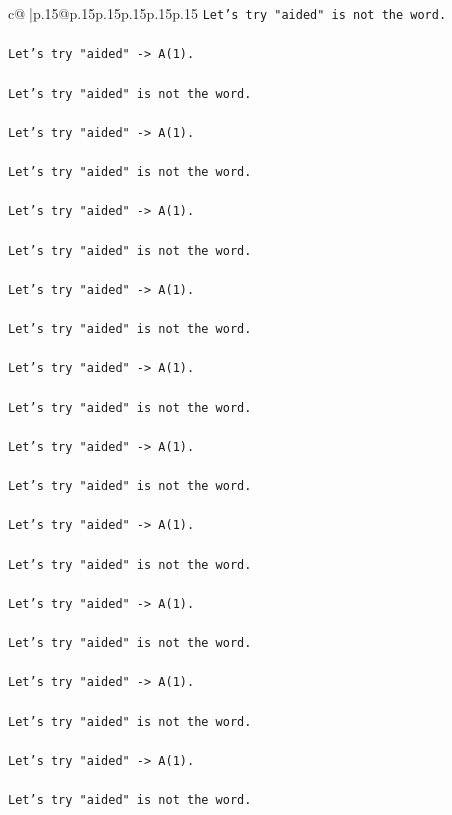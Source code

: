 \documentclass{article}
\begin{document}
{\begin{supertabular}{c@{$\;$}|p{.15\linewidth}@{}p{.15\linewidth}p{.15\linewidth}p{.15\linewidth}p{.15\linewidth}p{.15\linewidth}}
{{{\texttt{Let's try "aided" is not the word.} \\
\\ 
\texttt{Let's try "aided" {-}> A(1).} \\
\\ 
\texttt{Let's try "aided" is not the word.} \\
\\ 
\texttt{Let's try "aided" {-}> A(1).} \\
\\ 
\texttt{Let's try "aided" is not the word.} \\
\\ 
\texttt{Let's try "aided" {-}> A(1).} \\
\\ 
\texttt{Let's try "aided" is not the word.} \\
\\ 
\texttt{Let's try "aided" {-}> A(1).} \\
\\ 
\texttt{Let's try "aided" is not the word.} \\
\\ 
\texttt{Let's try "aided" {-}> A(1).} \\
\\ 
\texttt{Let's try "aided" is not the word.} \\
\\ 
\texttt{Let's try "aided" {-}> A(1).} \\
\\ 
\texttt{Let's try "aided" is not the word.} \\
\\ 
\texttt{Let's try "aided" {-}> A(1).} \\
\\ 
\texttt{Let's try "aided" is not the word.} \\
\\ 
\texttt{Let's try "aided" {-}> A(1).} \\
\\ 
\texttt{Let's try "aided" is not the word.} \\
\\ 
\texttt{Let's try "aided" {-}> A(1).} \\
\\ 
\texttt{Let's try "aided" is not the word.} \\
\\ 
\texttt{Let's try "aided" {-}> A(1).} \\
\\ 
\texttt{Let's try "aided" is not the word.} \\
}}}
\end{supertabular}}
\end{document}
